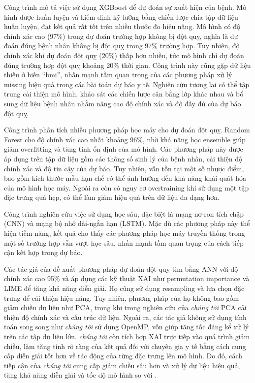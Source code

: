 Công trình  mô tả việc sử dụng XGBoost để dự đoán sự xuất hiện của bệnh. Mô hình được huấn luyện và kiểm định kỹ lưỡng bằng chiến lược chia tập dữ liệu huấn luyện, đạt kết quả rất tốt trên nhiều thước đo hiệu năng. Mô hình có độ chính xác cao (97\%) trong dự đoán trường hợp không bị đột quỵ, nghĩa là dự đoán đúng bệnh nhân không bị đột quỵ trong 97\% trường hợp. Tuy nhiên, độ chính xác khi dự đoán đột quỵ (20\%) thấp hơn nhiều, tức mô hình chỉ dự đoán đúng trường hợp đột quỵ khoảng 20\% thời gian. Công trình này cũng gặp dữ liệu thiếu ở biến ``bmi'', nhấn mạnh tầm quan trọng của các phương pháp xử lý missing hiệu quả trong các bài toán dự báo y tế. Nghiên cứu tương lai có thể tập trung cải thiện mô hình, khảo sát các chiến lược cân bằng lớp khác nhau và bổ sung dữ liệu bệnh nhân nhằm nâng cao độ chính xác và độ đầy đủ của dự báo đột quỵ.

Công trình  phân tích nhiều phương pháp học máy cho dự đoán đột quỵ. Random Forest cho độ chính xác cao nhất khoảng 96\%, nhờ khả năng học ensemble giúp giảm overfitting và tăng tính ổn định của mô hình. Các phương pháp này được áp dụng trên tập dữ liệu gồm các thông số sinh lý của bệnh nhân, cải thiện độ chính xác và độ tin cậy của dự báo. Tuy nhiên, vẫn tồn tại một số nhược điểm, bao gồm kích thước mẫu hạn chế có thể ảnh hưởng đến khả năng khái quát hóa của mô hình học máy. Ngoài ra còn có nguy cơ overtraining khi sử dụng một tập đặc trưng quá hẹp, có thể làm giảm hiệu quả trên dữ liệu đa dạng hơn.

Công trình  nghiên cứu việc sử dụng học sâu, đặc biệt là mạng nơ-ron tích chập (CNN) và mạng bộ nhớ dài-ngắn hạn (LSTM). Mặc dù các phương pháp này thể hiện tiềm năng, kết quả cho thấy các phương pháp học máy truyền thống trong một số trường hợp vẫn vượt học sâu, nhấn mạnh tầm quan trọng của cách tiếp cận kết hợp trong dự báo.

Các tác giả của  đề xuất phương pháp dự đoán đột quỵ tim bằng ANN với độ chính xác cao 95\% và áp dụng các kỹ thuật XAI như permutation importance và LIME để tăng khả năng diễn giải. Họ cũng sử dụng resampling và lựa chọn đặc trưng để cải thiện hiệu năng. Tuy nhiên, phương pháp của họ không bao gồm giảm chiều dữ liệu như PCA, trong khi trong nghiên cứu của \textit{chúng tôi} PCA cải thiện độ chính xác và cấu trúc dữ liệu. Ngoài ra, các tác giả không sử dụng tính toán song song như \textit{chúng tôi} sử dụng OpenMP, vốn giúp tăng tốc đáng kể xử lý trên các tập dữ liệu lớn. \textit{chúng tôi} còn tích hợp XAI trực tiếp vào quá trình giảm chiều, làm tăng tính rõ ràng của kết quả đối với chuyên gia y tế bằng cách cung cấp diễn giải tốt hơn về tác động của từng đặc trưng lên mô hình. Do đó, cách tiếp cận của \textit{chúng tôi} cung cấp giảm chiều sâu hơn và xử lý dữ liệu hiệu quả, tăng khả năng diễn giải và tốc độ mô hình so với .

